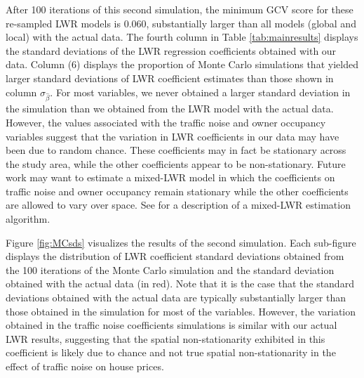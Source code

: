 \documentclass{article}\usepackage[]{graphicx}\usepackage[]{color}
\begin{document}
After 100 iterations of this second simulation, the minimum GCV score for these re-sampled LWR models is 0.060, substantially larger than all models (global and local) with the actual data. The fourth column in Table \ref{tab:mainresults} displays the standard deviations of the LWR regression coefficients obtained with our data. Column (6) displays the proportion of Monte Carlo simulations that yielded larger standard deviations of LWR coefficient estimates than those shown in column $\sigma_{\hat{\beta}}$. For most variables, we never obtained a larger standard deviation in the simulation than we obtained from the LWR model with the actual data. However, the values associated with the traffic noise and owner occupancy variables suggest that the variation in LWR coefficients in our data may have been due to random chance. These coefficients may in fact be stationary across the study area, while the other coefficients appear to be non-stationary. Future work may want to estimate a mixed-LWR model in which the coefficients on traffic noise and owner occupancy remain stationary while the other coefficients are allowed to vary over space. See \citet{Fotheringham2002} for a description of a mixed-LWR estimation algorithm. 

Figure \ref{fig:MCsds} visualizes the results of the second simulation. Each sub-figure displays the distribution of LWR coefficient standard deviations obtained from the 100 iterations of the Monte Carlo simulation and the standard deviation obtained with the actual data (in red). Note that it is the case that the standard deviations obtained with the actual data are typically substantially larger than those obtained in the simulation for most of the variables. However, the variation obtained in the traffic noise coefficients simulations is similar with our actual LWR results, suggesting that the spatial non-stationarity exhibited in this coefficient is likely due to chance and not true spatial non-stationarity in the effect of traffic noise on house prices. 
\end{document}
